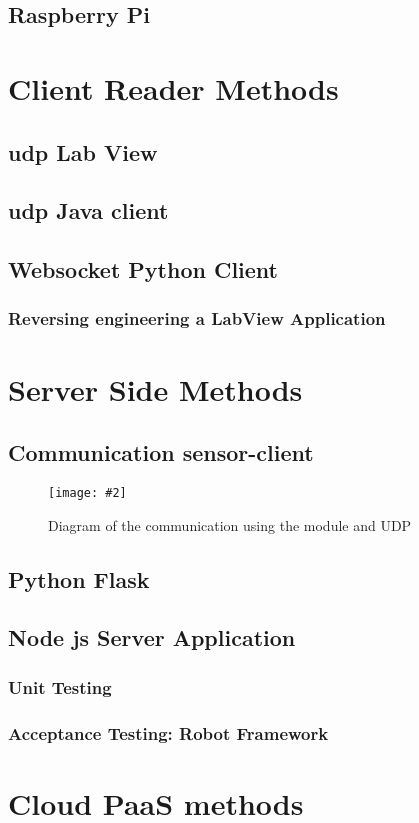 \documentclass[hidelinks,11pt,a4paper,oneside,article]{memoir}
\numberwithin{equation}{chapter}
\newcommand{\putimage}[3][10] %
{
\begin{figure}[h]
	\centering
	\captionsetup{justification=centering}
	\texttt{[image: \#2]}
	\caption{#3}
	\label{fig:#2}
\end{figure}
}
\begin{document}
\subsection{Raspberry Pi}


\section{Client Reader Methods}
\subsection{\gls{udp} Lab View}
\subsection{\gls{udp} Java client}
\subsection{Websocket Python Client}
\subsubsection{Reversing engineering a LabView Application}

\section{Server Side Methods}
\subsection{Communication sensor-client}
	\putimage{communication_udp}{Diagram of the communication using the module and UDP}
\subsection{Python Flask}
\subsection{Node js Server Application}
\subsubsection{Unit Testing}
\subsubsection{Acceptance Testing: Robot Framework}

\section{Cloud PaaS methods}
\end{document}
